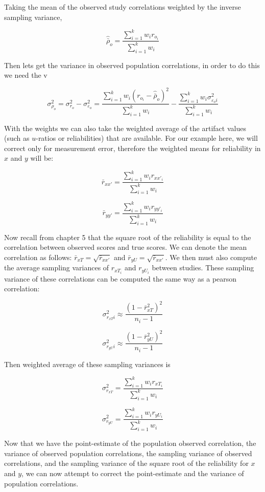 \documentclass[
  letterpaper,
  DIV=11,
  numbers=noendperiod]{scrreprt}
\begin{document}
Taking the mean of the observed study correlations weighted by the
inverse sampling variance,

\[
\hat{\bar{\rho}}_o=\frac{\sum^k_{i=1}w_i r_{o_i}}{\sum^k_{i=1}w_i}
\]

Then lets get the variance in observed population correlations, in order
to do this we need the v

\[
\sigma^2_{\rho_o}=\sigma^2_{r_o} - \sigma^2_{\varepsilon_o} = \frac{\sum^k_{i=1}w_i (r_{o_i}-\hat{\bar{\rho}}_o)^2}{\sum^k_{i=1}w_i} - \frac{\sum^k_{i=1}w_i \sigma^2_{\varepsilon_oi}}{\sum^k_{i=1}w_i}
\]

With the weights we can also take the weighted average of the artifact
values (such as \(u\)-ratios or reliabilities) that are available. For
our example here, we will correct only for measurement error, therefore
the weighted means for reliability in \(x\) and \(y\) will be:

\[
\bar{r}_{xx'}=\frac{\sum^k_{i=1}w_i r_{xx'_i}}{\sum^k_{i=1}w_i}
\]

\[
\bar{r}_{yy'}=\frac{\sum^k_{i=1}w_i r_{yy'_i}}{\sum^k_{i=1}w_i}
\]

Now recall from chapter 5 that the square root of the reliability is
equal to the correlation between observed scores and true scores. We can
denote the mean correlation as follows:
\(\bar{r}_{xT}=\sqrt{\bar{r}_{xx'}}\) and
\(\bar{r}_{yU}=\sqrt{\bar{r}_{xx'}}\). We then must also compute the
average sampling variances of \(r_{xT_i}\) and \(r_{yU_i}\) between
studies. These sampling variance of these correlations can be computed
the same way as a pearson correlation:

\[
\sigma^2_{r_{xT}i} \approx \frac{(1-\bar{r}_{xT}^2)^2}{n_i-1} 
\]

\[
\sigma^2_{r_{yU}i} \approx \frac{(1-\bar{r}_{yU}^2)^2}{n_i-1} 
\]

Then weighted average of these sampling variances is

\[
\sigma^2_{r_{xT}} = \frac{\sum^k_{i=1}w_i r_{xT_i}}{\sum^k_{i=1}w_i}
\]

\[
\sigma^2_{r_{yU}} = \frac{\sum^k_{i=1}w_i r_{yU_i}}{\sum^k_{i=1}w_i}
\]

Now that we have the point-estimate of the population observed
correlation, the variance of observed population correlations, the
sampling variance of observed correlations, and the sampling variance of
the square root of the reliability for \(x\) and \(y\), we can now
attempt to correct the point-estimate and the variance of population
correlations.
\end{document}
